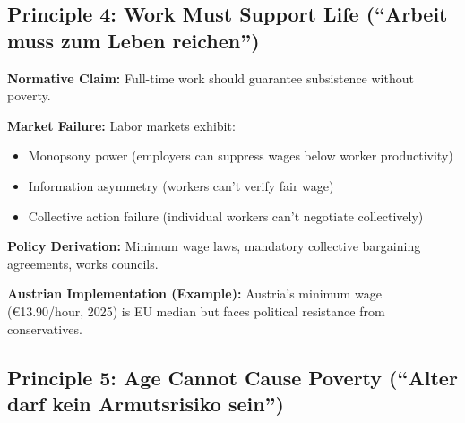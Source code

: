 
\subsection{Principle 4: Work Must Support Life (``Arbeit muss zum Leben reichen'')}

\begin{tcolorbox}[colback=gray!5!white, colframe=gray!75!black,
    title=Principle GEN-4: Dignity in Work]

\textbf{Normative Claim:} Full-time work should guarantee subsistence without poverty.

\textbf{Market Failure:} Labor markets exhibit:
\begin{itemize}[nosep]
\item Monopsony power (employers can suppress wages below worker productivity)
\item Information asymmetry (workers can't verify fair wage)
\item Collective action failure (individual workers can't negotiate collectively)
\end{itemize}

\textbf{Policy Derivation:} Minimum wage laws, mandatory collective bargaining agreements, works councils.

\textbf{Austrian Implementation (Example):} Austria's minimum wage (€13.90/hour, 2025) is EU median but faces political resistance from conservatives.

\end{tcolorbox}


\subsection{Principle 5: Age Cannot Cause Poverty (``Alter darf kein Armutsrisiko sein'')}

